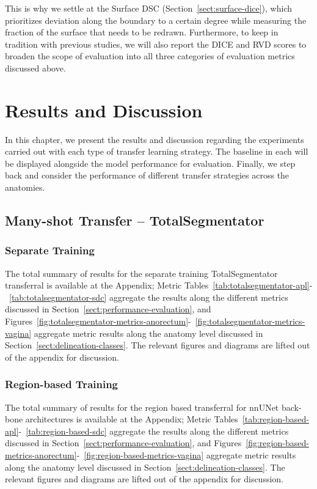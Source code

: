 \documentclass[12pt,twoside]{report}
\begin{document}
This is why we settle at the Surface DSC (Section~\ref{sect:surface-dice}), which prioritizes deviation along the boundary to a certain degree while measuring the fraction of the surface that needs to be redrawn. Furthermore, to keep in tradition with previous studies, we will also report the DICE and RVD scores to broaden the scope of evaluation into all three categories of evaluation metrics discussed above. 

\chapter{Results and Discussion}\label{sect:results}\label{sect:discussion}

In this chapter, we present the results and discussion regarding the experiments carried out with each type of transfer learning strategy. The baseline in each will be displayed alongside the model performance for evaluation. Finally, we step back and consider the performance of different transfer strategies across the anatomies.

\section{Many-shot Transfer -- TotalSegmentator}

\subsection{Separate Training}

The total summary of results for the separate training TotalSegmentator transferral is available at the Appendix; Metric Tables~\ref{tab:totalsegmentator-apl}-~\ref{tab:totalsegmentator-sdc} aggregate the results along the different metrics discussed in Section~\ref{sect:performance-evaluation}, and Figures~\ref{fig:totalsegmentator-metrics-anorectum}-~\ref{fig:totalsegmentator-metrics-vagina} aggregate metric results along the anatomy level discussed in Section~\ref{sect:delineation-classes}. The relevant figures and diagrams are lifted out of the appendix for discussion.

\subsection{Region-based Training}

The total summary of results for the region based transferral for nnUNet back-bone architectures is available at the Appendix; Metric Tables~\ref{tab:region-based-apl}-~\ref{tab:region-based-sdc} aggregate the results along the different metrics discussed in Section~\ref{sect:performance-evaluation}, and Figures~\ref{fig:region-based-metrics-anorectum}-~\ref{fig:region-based-metrics-vagina} aggregate metric results along the anatomy level discussed in Section~\ref{sect:delineation-classes}. The relevant figures and diagrams are lifted out of the appendix for discussion.
\end{document}
